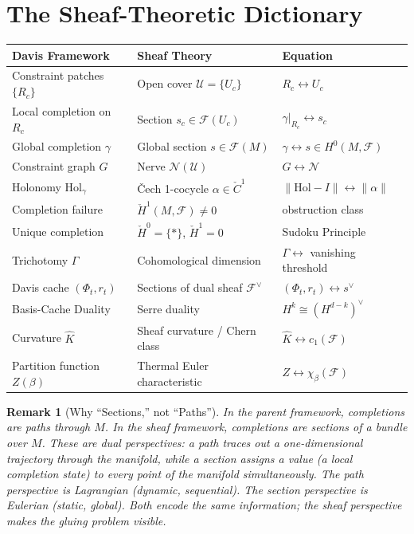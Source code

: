 \documentclass[11pt,letterpaper]{article}
\newtheorem{remark}[conjecture]{Remark}
\newcommand{\Hol}{\mathrm{Hol}}
\newcommand{\Khat}{\hat{K}}
\newcommand{\Cech}{\check{C}}
\newcommand{\Hcech}{\check{H}}
\newcommand{\sheaf}{\mathcal{F}}
\newcommand{\cover}{\mathcal{U}}
\newcommand{\nerve}{\mathcal{N}}
\begin{document}
\section{The Sheaf-Theoretic Dictionary}

\begin{center}
\renewcommand{\arraystretch}{1.4}
\begin{tabular}{lll}
\textbf{Davis Framework} & \textbf{Sheaf Theory} & \textbf{Equation} \\
\hline
Constraint patches $\{R_c\}$ & Open cover $\cover = \{U_c\}$ 
& $R_c \leftrightarrow U_c$ \\
Local completion on $R_c$ & Section $s_c \in \sheaf(U_c)$ 
& $\gamma|_{R_c} \leftrightarrow s_c$ \\
Global completion $\gamma$ & Global section $s \in \sheaf(M)$ 
& $\gamma \leftrightarrow s \in H^0(M, \sheaf)$ \\
Constraint graph $G$ & Nerve $\nerve(\cover)$ 
& $G \leftrightarrow \nerve$ \\
Holonomy $\Hol_\gamma$ & \v{C}ech 1-cocycle $\alpha \in \Cech^1$ 
& $\|\Hol - I\| \leftrightarrow \|\alpha\|$ \\
Completion failure & $\Hcech^1(M, \sheaf) \neq 0$ 
& obstruction class \\
Unique completion & $\Hcech^0 = \{*\}$, $\Hcech^1 = 0$ 
& Sudoku Principle \\
Trichotomy $\Gamma$ & Cohomological dimension 
& $\Gamma \leftrightarrow$ vanishing threshold \\
Davis cache $(\Phi_t, r_t)$ & Sections of dual sheaf $\sheaf^\vee$ 
& $(\Phi_t, r_t) \leftrightarrow s^\vee$ \\
Basis-Cache Duality & Serre duality 
& $H^k \cong (H^{d-k})^\vee$ \\
Curvature $\Khat$ & Sheaf curvature / Chern class 
& $\Khat \leftrightarrow c_1(\sheaf)$ \\
Partition function $Z(\beta)$ & Thermal Euler characteristic 
& $Z \leftrightarrow \chi_\beta(\sheaf)$ \\
\end{tabular}
\end{center}

\begin{remark}[Why ``Sections,'' not ``Paths'']
In the parent framework, completions are \emph{paths} through $M$. In 
the sheaf framework, completions are \emph{sections} of a bundle over 
$M$. These are dual perspectives: a path traces out a one-dimensional 
trajectory through the manifold, while a section assigns a value (a 
local completion state) to every point of the manifold simultaneously. 
The path perspective is Lagrangian (dynamic, sequential). The section 
perspective is Eulerian (static, global). Both encode the same 
information; the sheaf perspective makes the \emph{gluing problem} 
visible.
\end{remark}
\end{document}
